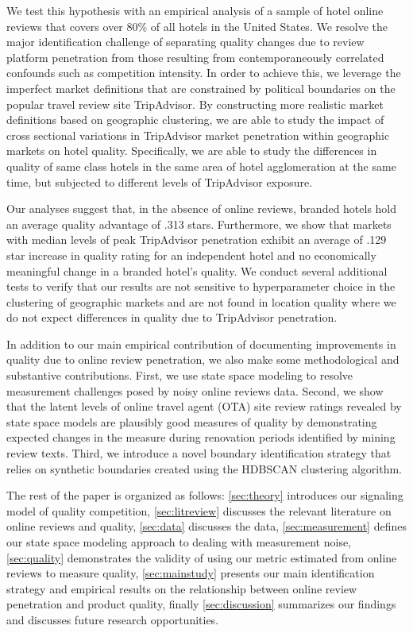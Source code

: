 \documentclass{informs_mod} %
\begin{document}
We test this hypothesis with an empirical analysis of a sample of hotel online reviews that covers over 80\% of all hotels in the United States. We resolve the major identification challenge of separating quality changes due to review platform penetration from those resulting from contemporaneously correlated confounds such as competition intensity. In order to achieve this, we leverage the imperfect market definitions that are constrained by political boundaries on the popular travel review site TripAdvisor. By constructing more realistic market definitions based on geographic clustering, we are able to study the impact of cross sectional variations in TripAdvisor market penetration within geographic markets on hotel quality. Specifically, we are able to study the differences in quality of same class hotels in the same area of hotel agglomeration at the same time, but subjected to different levels of TripAdvisor exposure. 

Our analyses suggest that, in the absence of online reviews, branded hotels hold an average quality advantage of .313 stars. Furthermore, we show that markets with median levels of peak TripAdvisor penetration exhibit an average of .129 star increase in quality rating for an independent hotel and no economically meaningful change in a branded hotel's quality. We conduct several additional tests to verify that our results are not sensitive to hyperparameter choice in the clustering of geographic markets and are not found in location quality where we do not expect differences in quality due to TripAdvisor penetration.

In addition to our main empirical contribution of documenting improvements in quality due to online review penetration, we also make some methodological and substantive contributions. First, we use state space modeling to resolve measurement challenges posed by noisy online reviews data. Second, we show that the latent levels of online travel agent (OTA) site review ratings revealed by state space models are plausibly good measures of quality by demonstrating expected changes in the measure during renovation periods identified by mining review texts. Third, we introduce a novel boundary identification strategy that relies on synthetic boundaries created using the HDBSCAN clustering algorithm. 

The rest of the paper is organized as follows: \cref{sec:theory} introduces our signaling model of quality competition, \cref{sec:litreview} discusses the relevant literature on online reviews and quality, \cref{sec:data} discusses the data, \cref{sec:measurement} defines our state space modeling approach to dealing with measurement noise, \cref{sec:quality} demonstrates the validity of using our metric estimated from online reviews to measure quality, \cref{sec:mainstudy} presents our main identification strategy and empirical results on the relationship between online review penetration and product quality, finally \cref{sec:discussion} summarizes our findings and discusses future research opportunities.
\end{document}
